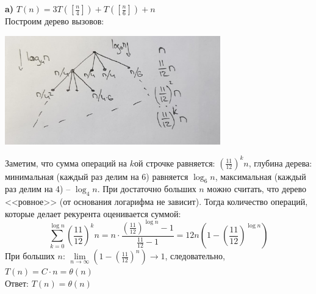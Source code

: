 \documentclass[a4paper,12pt]{article} %
\begin{document}
{\bf a)} $T(n)=3 T\left(\left[\frac{n}{4}\right]\right)+T\left(\left[\frac{n}{6}\right]\right)+n$ \\
Построим дерево вызовов:
\begin{center}
\includegraphics[width=0.7\textwidth]{tree_81}
\end{center}
Заметим, что сумма операций на $ k $ой строчке равняется: $ \left(\frac{11}{12}\right)^{k} n $, глубина дерева: минимальная (каждый раз делим на 6) равняется $ \log_6n $, максимальная (каждый раз делим на 4) -- $ \log_4n $. При достаточно больших $ n $ можно считать, что дерево <<ровное>> (от основания логарифма не зависит). Тогда количество операций, которые делает рекурента оценивается суммой:
$$
\sum_{k=0}^{\log n}\left(\frac{11}{12}\right)^{k} n=n \cdot \frac{\left(\frac{11}{12}\right)^{\log n}-1}{\frac{11}{12}-1}=12n\left(1-\left(\frac{11}{12}\right)^{\log n}\right)
$$ 
При больших $ n $: $ \lim\limits _{n \rightarrow \infty}\left(1-\left(\frac{11}{12}\right)^{n}\right) \rightarrow 1 $, следовательно, $ T(n)=C \cdot n=\theta(n) $\\
Ответ: $ T(n) = \theta(n) $\\
\end{document}
